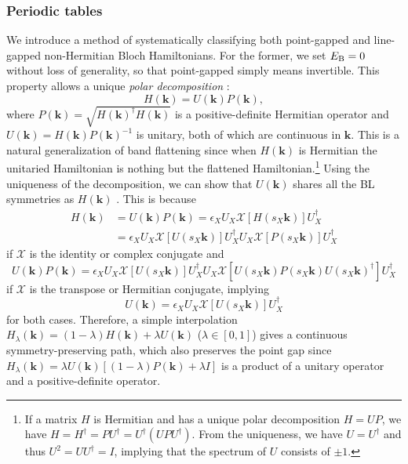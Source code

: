 \documentclass{tADP2e}
\theoremstyle{plain}
\theoremstyle{plain}
\theoremstyle{definition}
\begin{document}
\subsubsection{Periodic tables}
\label{Sec:NHPT}
We introduce a method of systematically classifying both point-gapped and line-gapped non-Hermitian Bloch Hamiltonians. For the former, we set $E_{\rm B}=0$ without loss of generality, so that point-gapped simply means %
invertible. This property allows a unique \emph{polar decomposition} \cite{ZG18}:
\begin{equation}
H(\boldsymbol{k})=U(\boldsymbol{k})P(\boldsymbol{k}),
\end{equation}
where $P(\boldsymbol{k})=\sqrt{H(\boldsymbol{k})^\dag H(\boldsymbol{k})}$ is a positive-definite Hermitian operator and $U(\boldsymbol{k})=H(\boldsymbol{k})P(\boldsymbol{k})^{-1}$ is unitary, both of which are continuous in $\boldsymbol{k}$. This is a natural generalization of band flattening \cite{AK09} since when $H(\boldsymbol{k})$ is Hermitian the unitaried Hamiltonian is nothing but the flattened Hamiltonian.\footnote{If a matrix $H$ is Hermitian and has a unique polar decomposition $H=UP$, we have $H=H^\dag=PU^\dag=U^\dag(UPU^\dag)$. From the uniqueness, we have $U=U^\dag$ and thus $U^2=UU^\dag=I$, implying that the spectrum of $U$ consists of $\pm1$.} Using the uniqueness of the decomposition, we can show that $U(\boldsymbol{k})$ shares all the BL symmetries as $H(\boldsymbol{k})$ \cite{ZH19}. This is because 
\begin{equation}
\begin{split}
H(\boldsymbol{k})&=U(\boldsymbol{k})P(\boldsymbol{k})=\epsilon_XU_X\mathcal{X}[H(s_X\boldsymbol{k})]U_X^\dag \\
&=\epsilon_X U_X\mathcal{X}[U(s_X\boldsymbol{k})]U_X^\dag U_X\mathcal{X}[P(s_X\boldsymbol{k})]U_X^\dag 
\end{split}
\end{equation}
if $\mathcal{X}$ is the identity or complex conjugate and
\begin{equation}
U(\boldsymbol{k})P(\boldsymbol{k})=\epsilon_X U_X\mathcal{X}[U(s_X\boldsymbol{k})]U_X^\dag U_X\mathcal{X}[U(s_X\boldsymbol{k})P(s_X\boldsymbol{k})U(s_X\boldsymbol{k})^\dag]U_X^\dag 
\end{equation}
if $\mathcal{X}$ is the transpose or Hermitian conjugate, implying
\begin{equation}
U(\boldsymbol{k})=\epsilon_X U_X\mathcal{X}[U(s_X\boldsymbol{k})]U_X^\dag
\end{equation} 
for both cases. Therefore, a simple interpolation $H_\lambda(\boldsymbol{k})=(1-\lambda) H(\boldsymbol{k})+\lambda U(\boldsymbol{k})$ ($\lambda\in[0,1]$) gives a continuous symmetry-preserving path, which  also preserves the point gap since $H_\lambda(\boldsymbol{k})=\lambda U(\boldsymbol{k})[(1-\lambda)P(\boldsymbol{k})+\lambda I]$ is a product of a unitary operator and a positive-definite operator. %
\end{document}
